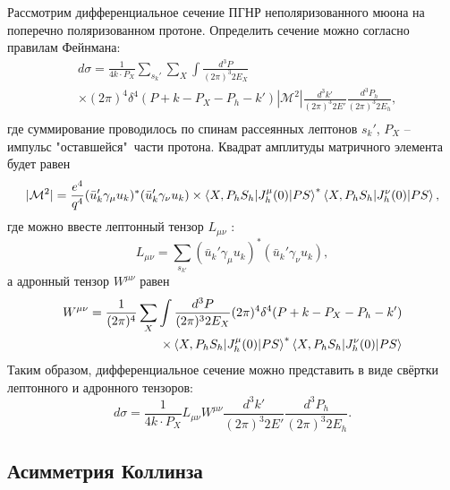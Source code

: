\documentclass{extarticle}
\begin{document}
Рассмотрим дифференциальное сечение ПГНР неполяризованного мюона на поперечно поляризованном протоне. Определить сечение можно согласно правилам Фейнмана:
\begin{equation}
\begin{split}
	& d\sigma = \frac{1}{4k\cdot P_X} \sum_{s_k'} \sum_X \int \frac{d^3 P}{(2\pi)^3 2 E_X} \\
	& \times (2\pi)^4 \delta^4(P+k-P_X - P_h - k')|\mathcal{M}^2| \frac{d^3 k'}{(2\pi)^3 2E'}\frac{d^3 P_h}{(2\pi)^3 2E_h}, \\
\end{split}
\end{equation}
где суммирование проводилось по спинам рассеянных лептонов $s_k'$, $P_X$ -- импульс "оставшейся"\ части протона. Квадрат амплитуды матричного элемента будет равен
\begin{equation}
		|\mathcal{M}^2| = \frac{e^4}{q^4} (\bar{u}_k'\gamma_\mu u_k)^{*}(\bar{u}_k'\gamma_\nu u_k) \times \braket{X, P_h S_h | J_h^\mu (0) | PS}^{*} \braket{X, P_h S_h | J_h^\nu (0) | PS},
\end{equation}
где можно ввесте лептонный тензор $L_{\mu \nu}$ \cite{Barone_2002}:
\begin{equation}
	L_{\mu \nu} = \sum_{s_{k'}} (\bar{u}_k'\gamma_\mu u_k)^{*}(\bar{u}_k'\gamma_\nu u_k),
\end{equation}
а адронный тензор $W^{\mu \nu}$ равен
\begin{equation}
	\begin{split}
		W^{\mu \nu} = \frac{1}{(2\pi)^4} \sum_X \int \frac{d^3 P}{(2\pi)^3 2 E_X} (2\pi)^4 \delta^4(P+k-P_X - P_h - k') \\
		\times \braket{X, P_h S_h | J_h^\mu (0) | PS}^{*} \braket{X, P_h S_h | J_h^\nu (0) | PS}
	\end{split}
\end{equation}
Таким образом, дифференциальное сечение можно представить в виде свёртки лептонного и адронного тензоров:
\begin{equation}
	d\sigma = \frac{1}{4k\cdot P_X} L_{\mu\nu} W^{\mu \nu} \frac{d^3 k'}{(2\pi)^3 2E'}\frac{d^3 P_h}{(2\pi)^3 2E_h}.
\end{equation}
\subsection{Асимметрия Коллинза}
\end{document}
